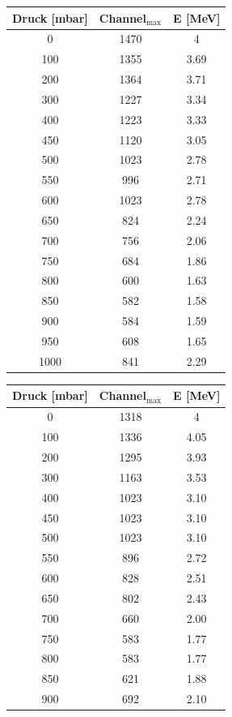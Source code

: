 \begin{minipage}[t]{0.3\textwidth}
\begin{tabular}{|c|c|c|} 
Druck [mbar]	&Channel$_\text{max}$	& E [MeV]\\ \hline
0		&1470			&4\\ \hline
100		&1355			&3.69\\ \hline
200		&1364			&3.71\\ \hline
300		&1227			&3.34\\ \hline
400		&1223			&3.33\\ \hline
450		&1120			&3.05\\ \hline
500		&1023			&2.78\\ \hline
550		&996			&2.71\\ \hline
600		&1023			&2.78\\ \hline
650		&824			&2.24\\ \hline
700		&756			&2.06\\ \hline
750		&684			&1.86\\ \hline
800		&600			&1.63\\ \hline
850		&582			&1.58\\ \hline
900		&584			&1.59\\ \hline
950		&608			&1.65\\ \hline
1000	&841			&2.29\\ \hline
\end{tabular}
\end{minipage}
\hspace{3cm}
\begin{minipage}[t]{0.3\textwidth}
\begin{tabular}{|c|c|c|}
Druck [mbar]	&Channel$_\text{max}$	& E [MeV]\\ \hline
0	&1318			&4\\ \hline
100	&1336			&4.05\\ \hline
200	&1295			&3.93\\ \hline
300	&1163			&3.53\\ \hline
400	&1023			&3.10\\ \hline
450	&1023			&3.10\\ \hline
500	&1023			&3.10\\ \hline
550	&896			&2.72\\ \hline
600	&828			&2.51\\ \hline
650	&802			&2.43\\ \hline
700	&660			&2.00\\ \hline
750	&583			&1.77\\ \hline
800	&583			&1.77\\ \hline
850	&621			&1.88\\ \hline
900	&692			&2.10\\ \hline
\end{tabular}
\end{minipage}

